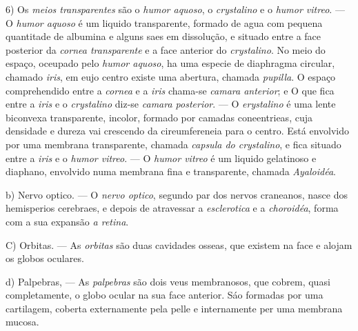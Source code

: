 6) Os \emph{meios transparentes} são o \emph{humor aquoso}, o \emph{crystalino} e o \emph{humor vitreo}. --- O \emph{humor aquoso} é um liquido transparente, formado de agua com pequena quantitade de albumina e alguns saes em dissolução, e situado entre a face posterior da \emph{cornea transparente} e a face anterior do \emph{crystalino}. No meio do espaço, oceupado pelo \emph{humor aquoso}, ha uma especie de diaphragma circular, chamado \emph{iris}, em eujo centro existe uma abertura, chamada \emph{pupilla}. O espaço comprehendido entre a \emph{cornea} e a \emph{iris} chama-se \emph{camara anterior}; e O que fica entre a \emph{iris} e o \emph{crystalino} diz-se \emph{camara posterior}. --- O \emph{erystalino} é uma lente biconvexa transparente, incolor, formado por camadas coneentrieas, cuja densidade e dureza vai crescendo da cireumfereneia para o centro. Está envolvido por uma membrana transparente, chamada \emph{capsula do crystalino}, e fica situado entre a \emph{iris} e o \emph{humor vitreo}. --- O \emph{humor vitreo} é um liquido gelatinoso e diaphano, envolvido numa membrana fina e transparente, chamada \emph{Ayaloidéa}.

b) Nervo optico. --- O \emph{nervo optico}, segundo par dos nervos craneanos, nasce dos hemisperios cerebraes, e depois de atravessar a \emph{esclerotica} e a \emph{choroidéa}, forma com a sua expansão \emph{a retina}.

C) Orbitas. --- As \emph{orbitas} são duas cavidades osseas, que existem na face e alojam os globos oculares.

d) Palpebras, --- As \emph{palpebras} são dois veus membranosos, que cobrem, quasi completamente, o globo ocular na sua face anterior. Sáo formadas por uma cartilagem, coberta externamente pela pelle e internamente per uma membrana mucosa.

